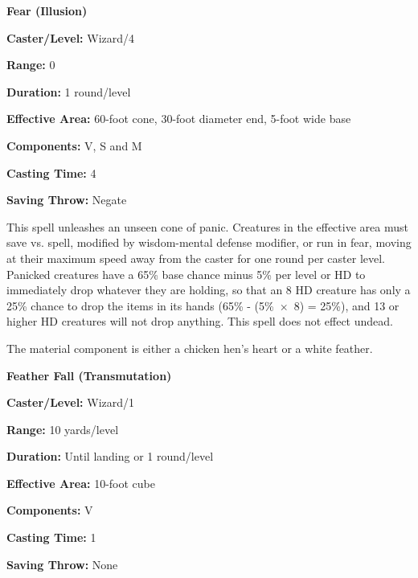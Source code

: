 \begin{multicols}{2}
\begin{minipage}{\columnwidth}
\noindent \textbf{Fear (Illusion)}

\noindent \textbf{Caster/Level:} Wizard/4

\noindent \textbf{Range:} 0

\noindent \textbf{Duration:} 1 round/level

\noindent \textbf{Effective Area:} 60-foot cone, 30-foot diameter end, 5-foot wide base

\noindent \textbf{Components:} V, S and M

\noindent \textbf{Casting Time:} 4

\noindent \textbf{Saving Throw:} Negate

\end{minipage}

This spell unleashes an unseen cone of panic.  Creatures in the effective area must save vs. spell, modified by wisdom-mental defense modifier, or run in fear, moving at their maximum speed away from the caster for one round per caster level.  Panicked creatures have a 65\% base chance minus 5\% per level or HD to immediately drop whatever they are holding, so that an 8 HD creature has only a 25\% chance to drop the items in its hands (65\% - (5\%~$\times$~8) = 25\%), and 13 or higher HD creatures will not drop anything.  This spell does not effect undead.

The material component is either a chicken hen's heart or a white feather.

\vspace{1em}

\noindent
\begin{minipage}{\columnwidth}

\noindent \textbf{Feather Fall (Transmutation)}

\noindent \textbf{Caster/Level:} Wizard/1

\noindent \textbf{Range:} 10 yards/level

\noindent \textbf{Duration:} Until landing or 1 round/level

\noindent \textbf{Effective Area:} 10-foot cube

\noindent \textbf{Components:} V

\noindent \textbf{Casting Time:} 1

\noindent \textbf{Saving Throw:} None

\end{minipage}


\end{multicols}
